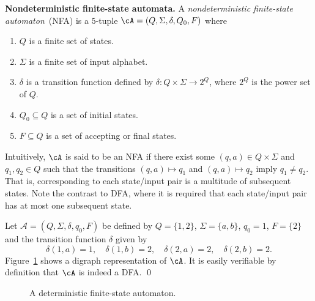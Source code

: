 \begin{definition}
\textbf{Nondeterministic finite-state automata.}
A \emph{nondeterministic finite-state automaton}~(NFA) is a
$5$-tuple
$\cA = (Q, \Sigma, \delta, Q_0, F)$ where
\begin{enumerate} \parskip=0.0in
  \item $Q$ is a finite set of states.

  \item $\Sigma$ is a finite set of input alphabet.

  \item $\delta$ is a transition function
    defined by $\delta: Q \times \Sigma \to 2^Q$, where $2^Q$ is the
    power set of $Q$.

  \item $Q_0 \subseteq Q$ is a set of initial
    states.

  \item $F \subseteq Q$ is a set of accepting
    or final states.
\end{enumerate}
\end{definition}

Intuitively, $\cA$ is said to be an NFA if there exist some
$(q,a) \in Q \times \Sigma$ and $q_1, q_2 \in Q$ such that the
transitions $(q,a) \mapsto q_1$ and $(q,a) \mapsto q_2$ imply
$q_1 \neq q_2$. That is, corresponding to each state/input pair is a
multitude of subsequent states. Note the contrast to DFA, where it is
required that each state/input pair has at most one subsequent state.

\begin{example}
\label{eg:introduction:deterministic_finite_automaton}
\rm
Let $\mathcal{A} = (Q, \Sigma, \delta, q_0, F)$ be defined by $Q =
\{ 1, 2 \}$, $\Sigma = \{ a, b \}$, $q_0 = 1$, $F = \{ 2 \}$
and the transition function $\delta$ given by
\[
\delta(1,a) = 1,\quad
\delta(1,b) = 2,\quad
\delta(2,a) = 2,\quad
\delta(2,b) = 2.
\]
Figure~\ref{fig:introduction:deterministic_finite_state_automaton}
shows a digraph representation of $\cA$. It is easily verifiable by
definition that $\cA$ is indeed a DFA. \qed
\end{example}

\begin{figure}[!htbp]
\centering
{}

\caption{A deterministic finite-state automaton.}
\label{fig:introduction:deterministic_finite_state_automaton}
\end{figure}


